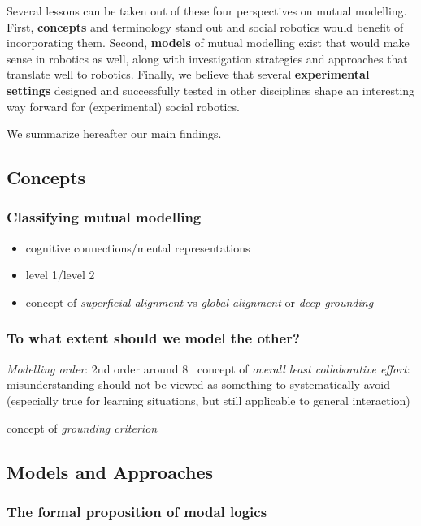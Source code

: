 \documentclass{sig-alternate}
\begin{document}
Several lessons can be taken out of these four perspectives on mutual modelling.
First, \textbf{concepts} and terminology stand out and social robotics would
benefit of incorporating them. Second, \textbf{models} of mutual modelling exist that
would make sense in robotics as well, along with investigation strategies and
approaches that translate well to robotics. Finally, we believe that several
\textbf{experimental settings} designed and successfully tested in other disciplines
shape an interesting way forward for (experimental) social robotics.

We summarize hereafter our main findings.

\subsection{Concepts}

\subsubsection{Classifying mutual modelling}

\begin{itemize}
    \item cognitive connections/mental representations
    \item level 1/level 2
    \item concept of \emph{superficial alignment} vs \emph{global alignment} or \emph{deep grounding}
\end{itemize}


\subsubsection{To what extent should we model the other?}

\emph{Modelling order}: 2nd order around 8~\cite{perner1988higher}
concept of \emph{overall least collaborative effort}: misunderstanding should not be viewed as something to systematically
        avoid (especially true for learning situations, but still applicable to
        general interaction)

concept of \emph{grounding criterion}

\subsection{Models and Approaches}

\subsubsection{The formal proposition of modal logics}
\end{document}
